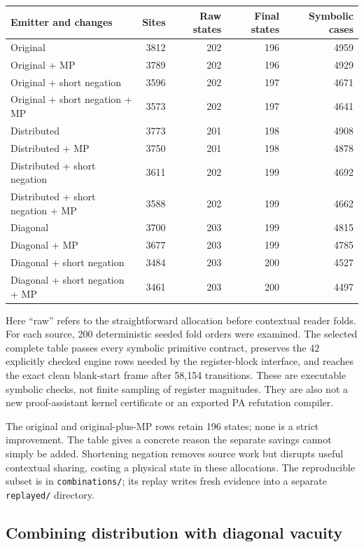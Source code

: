\begin{center}\small
\begin{tabular}{lrrrr}
\hline
Emitter and changes & Sites & Raw states & Final states & Symbolic cases\\
\hline
Original &3812&202&196&4959\\
Original + MP &3789&202&196&4929\\
Original + short negation &3596&202&197&4671\\
Original + short negation + MP &3573&202&197&4641\\
Distributed &3773&201&198&4908\\
Distributed + MP &3750&201&198&4878\\
Distributed + short negation &3611&202&199&4692\\
Distributed + short negation + MP &3588&202&199&4662\\
Diagonal &3700&203&199&4815\\
Diagonal + MP &3677&203&199&4785\\
Diagonal + short negation &3484&203&200&4527\\
Diagonal + short negation + MP &3461&203&200&4497\\
\hline
\end{tabular}
\end{center}

Here ``raw'' refers to the straightforward allocation before contextual
reader folds. For each source, 200 deterministic seeded fold orders were
examined. The selected complete table passes every symbolic primitive
contract, preserves the 42 explicitly checked engine rows needed by the
register-block interface, and reaches the exact clean blank-start frame
after 58,154 transitions. These are executable symbolic checks, not
finite sampling of register magnitudes. They are also not a new
proof-assistant kernel certificate or an exported PA refutation compiler.

The original and original-plus-MP rows retain 196 states; none is a
strict improvement. The table gives a concrete reason the separate
savings cannot simply be added. Shortening negation removes source work
but disrupts useful contextual sharing, costing a physical state in
these allocations. The reproducible subset is in
\texttt{combinations/}; its replay writes fresh evidence into a separate
\texttt{replayed/} directory.

\subsection{Combining distribution with diagonal vacuity}

